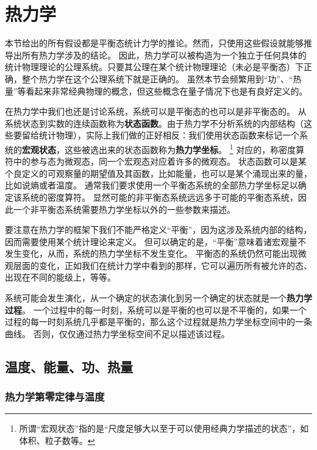\documentclass[hyperref, UTF8, a4paper]{ctexart}
\begin{document}

\section{热力学}

本节给出的所有假设都是平衡态统计力学的推论。然而，只使用这些假设就能够推导出所有热力学涉及的结论。
因此，热力学可以被构造为一个独立于任何具体的统计物理理论的公理系统。只要其公理在某个统计物理理论（未必是平衡态）下正确，整个热力学在这个公理系统下就是正确的。
虽然本节会频繁用到“功”、“热量”等看起来非常经典物理的概念，但这些概念在量子情况下也是有良好定义的。

在热力学中我们也还是讨论系统，系统可以是平衡态的也可以是非平衡态的。
从系统状态到实数的连续函数称为\textbf{状态函数}。由于热力学不分析系统的内部结构（这些要留给统计物理），实际上我们做的正好相反：我们使用状态函数来标记一个系统的\textbf{宏观状态}，这些被选出来的状态函数称为\textbf{热力学坐标}。%
\footnote{所谓“宏观状态”指的是“尺度足够大以至于可以使用经典力学描述的状态”，如体积、粒子数等。}%
对应的，称密度算符中的参与态为微观态，同一个宏观态对应着许多的微观态。
状态函数可以是某个良定义的可观察量的期望值及其函数，比如能量，也可以是某个涌现出来的量，比如说熵或者温度。
通常我们要求使用一个平衡态系统的全部热力学坐标足以确定该系统的密度算符。
显然可能的非平衡态系统远远多于可能的平衡态系统，因此一个非平衡态系统需要热力学坐标以外的一些参数来描述。

要注意在热力学的框架下我们不能严格定义“平衡”，因为这涉及系统内部的结构，因而需要使用某个统计理论来定义。
但可以确定的是，“平衡”意味着诸宏观量不发生变化，从而，系统的热力学坐标不发生变化。
平衡态的系统仍然可能出现微观层面的变化，正如我们在统计力学中看到的那样，它可以遍历所有被允许的态、出现在不同的能级上，等等。

系统可能会发生演化，从一个确定的状态演化到另一个确定的状态就是一个\textbf{热力学过程}。
一个过程中的每一时刻，系统可以是平衡的也可以是不平衡的，如果一个过程的每一时刻系统几乎都是平衡的，那么这个过程就是热力学坐标空间中的一条曲线。
否则，仅仅通过热力学坐标空间不足以描述该过程。

\subsection{温度、能量、功、热量}

\subsubsection{热力学第零定律与温度}
\end{document}
